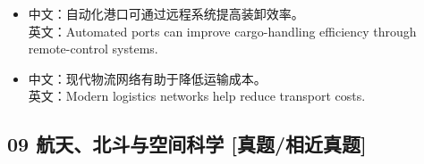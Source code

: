 \documentclass[a4paper,11pt,UTF8,fontset=none]{ctexart}
\begin{document}
\endgroup
\vspace{-2pt}

\par

\begin{itemize}[leftmargin=1.7em,itemsep=1pt,parsep=0pt,topsep=2pt]
\item \noindent 中文：自动化港口可通过远程系统提高装卸效率。\\ 英文：Automated ports can improve cargo-handling efficiency through remote-control systems.\par


\item \noindent 中文：现代物流网络有助于降低运输成本。\\ 英文：Modern logistics networks help reduce transport costs.\par


\end{itemize}

\subsection{09 航天、北斗与空间科学 {\color{AccentBlue} [真题/相近真题]}}
\end{document}
